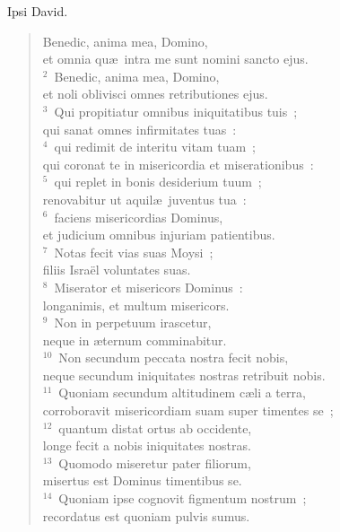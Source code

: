 \bchapter
\lettrine[lines=3,image=true,loversize=0.05,lraise=-0.03]{I}{}psi David. \begin{flushleft}\begin{verse}\vspace{6pt}Benedic, anima mea, Domino,\\ et omnia qu\ae\ intra me sunt nomini sancto ejus.\\
${}^{2}$~Benedic, anima mea, Domino,\\ et noli oblivisci omnes retributiones ejus.\\
${}^{3}$~Qui propitiatur omnibus iniquitatibus tuis~;\\ qui sanat omnes infirmitates tuas~:\\
${}^{4}$~qui redimit de interitu vitam tuam~;\\ qui coronat te in misericordia et miserationibus~:\\
${}^{5}$~qui replet in bonis desiderium tuum~;\\ renovabitur ut aquil\ae\ juventus tua~:\\
${}^{6}$~faciens misericordias Dominus,\\ et judicium omnibus injuriam patientibus.\\
${}^{7}$~Notas fecit vias suas Moysi~;\\ filiis Isra\"el voluntates suas.\\
${}^{8}$~Miserator et misericors Dominus~:\\ longanimis, et multum misericors.\\
${}^{9}$~Non in perpetuum irascetur,\\ neque in \ae ternum comminabitur.\\
${}^{10}$~Non secundum peccata nostra fecit nobis,\\ neque secundum iniquitates nostras retribuit nobis.\\
${}^{11}$~Quoniam secundum altitudinem c\ae li a terra,\\ corroboravit misericordiam suam super timentes se~;\\
${}^{12}$~quantum distat ortus ab occidente,\\ longe fecit a nobis iniquitates nostras.\\
${}^{13}$~Quomodo miseretur pater filiorum,\\ misertus est Dominus timentibus se.\\
${}^{14}$~Quoniam ipse cognovit figmentum nostrum~;\\ recordatus est quoniam pulvis sumus.\\

\end{verse}
\end{flushleft}
